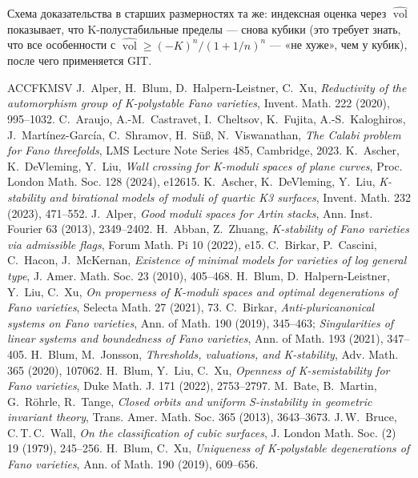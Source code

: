 \documentclass[11pt,a4paper]{article}
\theoremstyle{plain}
\theoremstyle{definition}
\theoremstyle{remark}
\DeclareMathOperator{\vol}{vol}
\newcommand{\hvol}{\widehat{\vol}}
\begin{document}
Схема доказательства в старших размерностях та же: индексная оценка через $\hvol$ показывает, что
K-полустабильные пределы --- снова кубики (это требует знать, что все особенности с
$\hvol\ge(-K)^n/(1+1/n)^n$ --- «не хуже», чем у кубик), после чего применяется GIT.


\begin{thebibliography}{ACCFKMSV}
 J.~Alper, H.~Blum, D.~Halpern-Leistner, C.~Xu, \emph{Reductivity of the automorphism group of K-polystable Fano varieties}, Invent. Math. 222 (2020), 995--1032.
 C.~Araujo, A.-M.~Castravet, I.~Cheltsov, K.~Fujita, A.-S.~Kaloghiros, J.~Mart\'inez-Garc\'ia, C.~Shramov, H.~S\"u\ss, N.~Viswanathan, \emph{The Calabi problem for Fano threefolds}, LMS Lecture Note Series 485, Cambridge, 2023.
 K.~Ascher, K.~DeVleming, Y.~Liu, \emph{Wall crossing for K-moduli spaces of plane curves}, Proc. London Math. Soc. 128 (2024), e12615.
 K.~Ascher, K.~DeVleming, Y.~Liu, \emph{K-stability and birational models of moduli of quartic K3 surfaces}, Invent. Math. 232 (2023), 471--552.
 J.~Alper, \emph{Good moduli spaces for Artin stacks}, Ann. Inst. Fourier 63 (2013), 2349--2402.
 H.~Abban, Z.~Zhuang, \emph{K-stability of Fano varieties via admissible flags}, Forum Math. Pi 10 (2022), e15.
 C.~Birkar, P.~Cascini, C.~Hacon, J.~McKernan, \emph{Existence of minimal models for varieties of log general type}, J. Amer. Math. Soc. 23 (2010), 405--468.
 H.~Blum, D.~Halpern-Leistner, Y.~Liu, C.~Xu, \emph{On properness of K-moduli spaces and optimal degenerations of Fano varieties}, Selecta Math. 27 (2021), 73.
 C.~Birkar, \emph{Anti-pluricanonical systems on Fano varieties}, Ann. of Math. 190 (2019), 345--463; \emph{Singularities of linear systems and boundedness of Fano varieties}, Ann. of Math. 193 (2021), 347--405.
 H.~Blum, M.~Jonsson, \emph{Thresholds, valuations, and K-stability}, Adv. Math. 365 (2020), 107062.
 H.~Blum, Y.~Liu, C.~Xu, \emph{Openness of K-semistability for Fano varieties}, Duke Math. J. 171 (2022), 2753--2797.
 M.~Bate, B.~Martin, G.~R\"ohrle, R.~Tange, \emph{Closed orbits and uniform S-instability in geometric invariant theory}, Trans. Amer. Math. Soc. 365 (2013), 3643--3673.
 J.\,W.~Bruce, C.\,T.\,C.~Wall, \emph{On the classification of cubic surfaces}, J. London Math. Soc. (2) 19 (1979), 245--256.
 H.~Blum, C.~Xu, \emph{Uniqueness of K-polystable degenerations of Fano varieties}, Ann. of Math. 190 (2019), 609--656.

\end{thebibliography}
\end{document}

